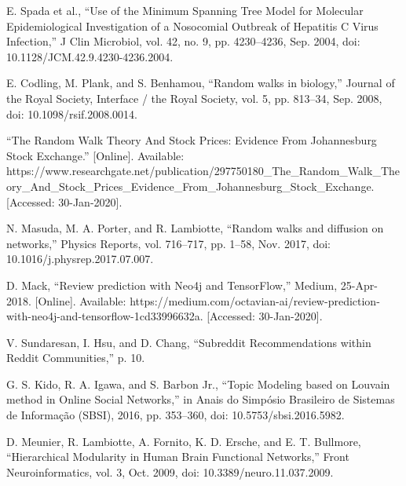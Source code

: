 \documentclass[journal,twoside,web]{ieeecolor}
\begin{document}
\begin{thebibliography}{9}
     E. Spada et al., “Use of the Minimum Spanning Tree Model for Molecular Epidemiological Investigation of a Nosocomial Outbreak of Hepatitis C Virus Infection,” J Clin Microbiol, vol. 42, no. 9, pp. 4230–4236, Sep. 2004, doi: 10.1128/JCM.42.9.4230-4236.2004.

     E. Codling, M. Plank, and S. Benhamou, “Random walks in biology,” Journal of the Royal Society, Interface / the Royal Society, vol. 5, pp. 813–34, Sep. 2008, doi: 10.1098/rsif.2008.0014.
    
     “The Random Walk Theory And Stock Prices: Evidence From Johannesburg Stock Exchange.” [Online]. Available: https://www.researchgate.net/publication/297750180{\_}The{\_}Random{\_}Walk{\_}Theory{\_}And{\_}Stock{\_}Prices{\_}Evidence{\_}From{\_}Johannesburg{\_}Stock{\_}Exchange. [Accessed: 30-Jan-2020].

     N. Masuda, M. A. Porter, and R. Lambiotte, “Random walks and diffusion on networks,” Physics Reports, vol. 716–717, pp. 1–58, Nov. 2017, doi: 10.1016/j.physrep.2017.07.007.
    
     D. Mack, “Review prediction with Neo4j and TensorFlow,” Medium, 25-Apr-2018. [Online]. Available: https://medium.com/octavian-ai/review-prediction-with-neo4j-and-tensorflow-1cd33996632a. [Accessed: 30-Jan-2020].
    
     V. Sundaresan, I. Hsu, and D. Chang, “Subreddit Recommendations within Reddit Communities,” p. 10.

     G. S. Kido, R. A. Igawa, and S. Barbon Jr., “Topic Modeling based on Louvain method in Online Social Networks,” in Anais do Simpósio Brasileiro de Sistemas de Informação (SBSI), 2016, pp. 353–360, doi: 10.5753/sbsi.2016.5982.
    
     D. Meunier, R. Lambiotte, A. Fornito, K. D. Ersche, and E. T. Bullmore, “Hierarchical Modularity in Human Brain Functional Networks,” Front Neuroinformatics, vol. 3, Oct. 2009, doi: 10.3389/neuro.11.037.2009.

\end{thebibliography}
\end{document}
